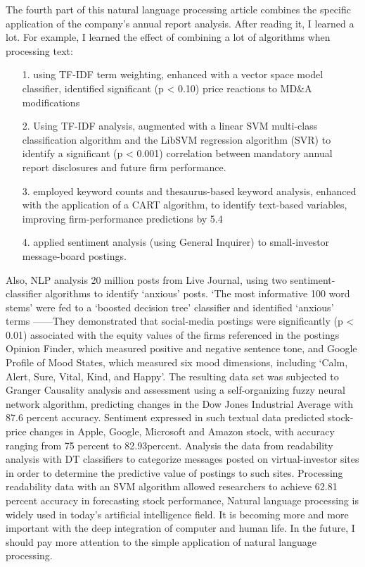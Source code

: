 \documentclass{article}
\begin{document}
The fourth part of this natural language processing article combines the specific application of the company's annual report analysis. After reading it, I learned a lot. For example, I learned the effect of combining a lot of algorithms when processing text:
\begin{itemize}
    \item[1.] using TF-IDF term weighting, enhanced with a vector space model classiﬁer, identiﬁed signiﬁcant (p < 0.10) price reactions to MD&A modiﬁcations
    \item[2.]Using TF-IDF analysis, augmented with a linear SVM multi-class classiﬁcation algorithm and the LibSVM regression algorithm (SVR) to identify a signiﬁcant (p < 0.001) correlation between mandatory annual report disclosures and future ﬁrm performance.
    \item[3.]employed keyword counts and thesaurus-based keyword analysis, enhanced with the application of a CART algorithm, to identify text-based variables, improving ﬁrm-performance predictions by 5.4%
    \item[4.]applied sentiment analysis (using General Inquirer) to small-investor message-board postings.
\end{itemize}
Also, NLP analysis 20 million posts from Live Journal, using two sentiment-classifier algorithms to identify ‘anxious’ posts. ‘The most informative 100 word stems’ were fed to a ‘boosted decision tree’ classifier and identified ‘anxious’ terms ——They demonstrated that social-media postings were significantly (p < 0.01) associated with the equity values of the firms referenced in the postings 
Opinion Finder, which measured positive and negative sentence tone, and Google Profile of Mood States, which measured six mood dimensions, including ‘Calm, Alert, Sure, Vital, Kind, and Happy’. The resulting data set was subjected to Granger Causality analysis and assessment using a self-organizing fuzzy neural network algorithm, predicting changes in the Dow Jones Industrial Average with 87.6 percent accuracy. 
Sentiment expressed in such textual data predicted stock-price changes in Apple, Google, Microsoft and Amazon stock, with accuracy ranging from 75 percent to 82.93percent.
Analysis the data from readability analysis with DT classifiers to categorize messages posted on virtual-investor sites in order to determine the predictive value of postings to such sites. Processing readability data with an SVM algorithm allowed researchers to achieve 62.81 percent accuracy in forecasting stock performance,
Natural language processing is widely used in today's artificial intelligence field. It is becoming more and more important with the deep integration of computer and human life. In the future, I should pay more attention to the simple application of natural language processing.
\end{document}
